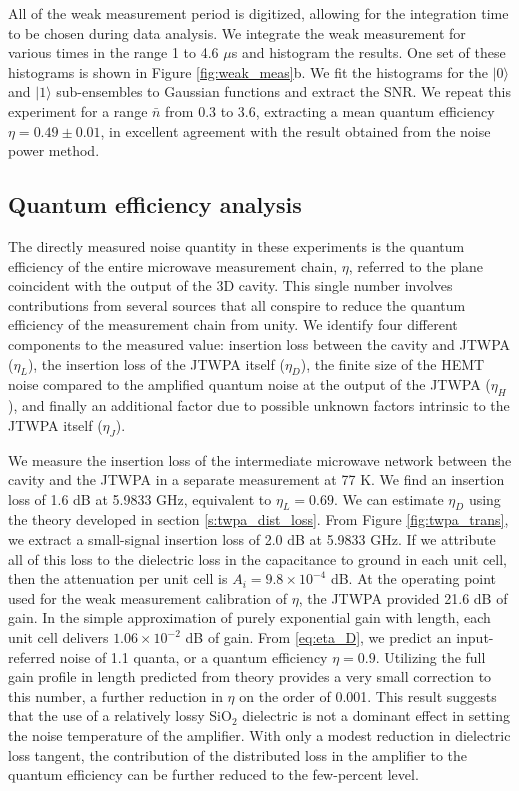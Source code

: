 All of the weak measurement period is digitized, allowing for the integration time to be chosen during data analysis.  We integrate the weak measurement for various times in the range 1 to 4.6 $\mu$s and histogram the results.  One set of these histograms is shown in Figure \ref{fig:weak_meas}b.  We fit the histograms for the $|0\rangle$ and $|1\rangle$ sub-ensembles to Gaussian functions and extract the SNR.  We repeat this experiment for a range $\bar{n}$ from 0.3 to 3.6, extracting a mean quantum efficiency $\eta = 0.49 \pm 0.01$, in excellent agreement with the result obtained from the noise power method.

\subsection{Quantum efficiency analysis}

The directly measured noise quantity in these experiments is the quantum efficiency of the entire microwave measurement chain, $\eta$, referred to the plane coincident with the output of the 3D cavity.  This single number involves contributions from several sources that all conspire to reduce the quantum efficiency of the measurement chain from unity.  We identify four different components to the measured value: insertion loss between the cavity and JTWPA ($\eta_L$), the insertion loss of the JTWPA itself ($\eta_D$), the finite size of the HEMT noise compared to the amplified quantum noise at the output of the JTWPA ($\eta_H$), and finally an additional factor due to possible unknown factors intrinsic to the JTWPA itself ($\eta_J$).

We measure the insertion loss of the intermediate microwave network between the cavity and the JTWPA in a separate measurement at 77 K.  We find an insertion loss of 1.6 dB at 5.9833 GHz, equivalent to $\eta_L = 0.69$.  We can estimate $\eta_D$ using the theory developed in section \ref{s:twpa_dist_loss}.  From Figure \ref{fig:twpa_trans}, we extract a small-signal insertion loss of 2.0 dB at 5.9833 GHz.  If we attribute all of this loss to the dielectric loss in the capacitance to ground in each unit cell, then the attenuation per unit cell is $A_i = 9.8 \times 10^{-4}$ dB.  At the operating point used for the weak measurement calibration of $\eta$, the JTWPA provided 21.6 dB of gain.  In the simple approximation of purely exponential gain with length, each unit cell delivers $1.06 \times 10^{-2}$ dB of gain.  From \eqref{eq:eta_D}, we predict an input-referred noise of 1.1 quanta, or a quantum efficiency $\eta = 0.9$.  Utilizing the full gain profile in length predicted from theory provides a very small correction to this number, a further reduction in $\eta$ on the order of 0.001.  This result suggests that the use of a relatively lossy SiO$_2$ dielectric is not a dominant effect in setting the noise temperature of the amplifier.  With only a modest reduction in dielectric loss tangent, the contribution of the distributed loss in the amplifier to the quantum efficiency can be further reduced to the few-percent level.

